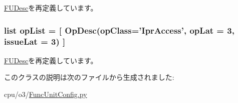 \hyperlink{classFuncUnit_1_1FUDesc_adf167b42e49fa9d4114bff901e1b1c29}{FUDesc}を再定義しています。\hypertarget{classFuncUnitConfig_1_1IprPort_a31b2f9e3ac9a504397b140f513c469cc}{
\subsubsection[{opList}]{\setlength{\rightskip}{0pt plus 5cm}list {\bf opList} = \mbox{[} {\bf OpDesc}(opClass='IprAccess', opLat = 3, issueLat = 3) \mbox{]}}}
\label{classFuncUnitConfig_1_1IprPort_a31b2f9e3ac9a504397b140f513c469cc}


\hyperlink{classFuncUnit_1_1FUDesc_aa7a0c51c9e0149c27f9e38f86005dfbe}{FUDesc}を再定義しています。

このクラスの説明は次のファイルから生成されました:\begin{DoxyCompactItemize}
\item 
cpu/o3/\hyperlink{FuncUnitConfig_8py}{FuncUnitConfig.py}\end{DoxyCompactItemize}
